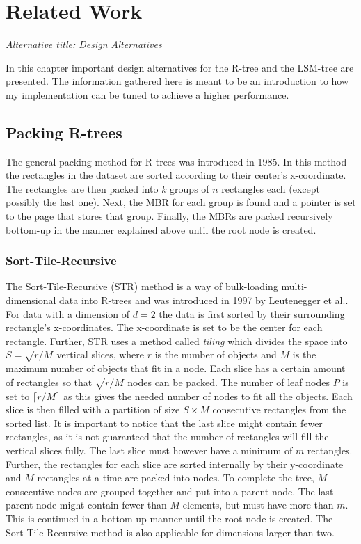 \chapter{Related Work}

\emph{Alternative title: Design Alternatives}\newline

\noindent
In this chapter important design alternatives for the R-tree and the LSM-tree are presented. The information gathered here is meant to be an introduction to how my implementation can be tuned to achieve a higher performance. 


\section{Packing R-trees}
The general packing method for R-trees was introduced in 1985\cite{DirectSpatialSearch}. In this method the rectangles in the dataset are sorted according to their center's x-coordinate. The rectangles are then packed into $k$ groups of $n$ rectangles each (except possibly the last one). Next, the MBR for each group is found and a pointer is set to the page that stores that group. Finally, the MBRs are packed recursively bottom-up in the manner explained above until the root node is created. 

\subsection{Sort-Tile-Recursive}
The Sort-Tile-Recursive (STR) method is a way of bulk-loading multi-dimensional data into R-trees and was introduced in 1997 by Leutenegger et al.\cite{STR}. For data with a dimension of $d=2$ the data is first sorted by their surrounding rectangle's x-coordinates. The x-coordinate is set to be the center for each rectangle. Further, STR uses a method called \emph{tiling} which divides the space into $S = \sqrt{r/M}$ vertical slices, where $r$ is the number of objects and $M$ is the maximum number of objects that fit in a node. Each slice has a certain amount of rectangles so that $\sqrt{r/M}$ nodes can be packed. The number of leaf nodes $P$ is set to $\lceil{r/M}\rceil$ as this gives the needed number of nodes to fit all the objects. Each slice is then filled with a partition of size $S \times M$ consecutive rectangles from the sorted list. It is important to notice that the last slice might contain fewer rectangles, as it is not guaranteed that the number of rectangles will fill the vertical slices fully. The last slice must however have a minimum of $m$ rectangles. Further, the rectangles for each slice are sorted internally by their y-coordinate and $M$ rectangles at a time are packed into nodes. To complete the tree, $M$ consecutive nodes are grouped together and put into a parent node. The last parent node might contain fewer than $M$ elements, but must have more than $m$. This is continued in a bottom-up manner until the root node is created. The Sort-Tile-Recursive method is also applicable for dimensions larger than two. \newline

